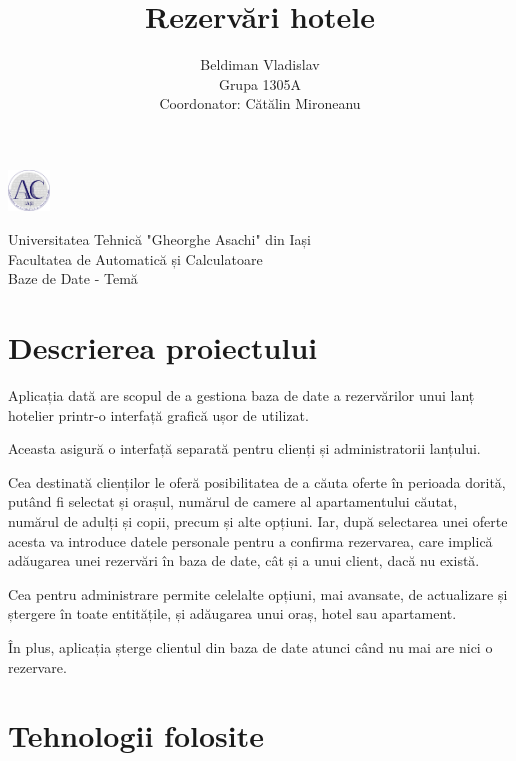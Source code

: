 \documentclass[12pt]{article}
\title{\textbf{Rezervări hotele}}
\author{
	Beldiman Vladislav \\ Grupa 1305A
	\\
	Coordonator: Cătălin Mironeanu
}
\begin{document}
\noindent\begin{minipage}{0.1\textwidth}
	\includegraphics[width=1.1cm]{logo_AC.png}
\end{minipage}
\hfill
\begin{minipage}{1\textwidth}\raggedright
	Universitatea Tehnică "Gheorghe Asachi" din Iași\\
	Facultatea de Automatică și Calculatoare\\
	Baze de Date - Temă
\end{minipage}

\vspace{5cm}
{\let\newpage\relax\maketitle}
\newpage

\tableofcontents

\vspace{4cm}

\section{Descrierea proiectului}

Aplicația dată are scopul de a gestiona baza de date a rezervărilor unui lanț hotelier printr-o interfață grafică ușor de utilizat.

Aceasta asigură o interfață separată pentru clienți și administratorii lanțului.

Cea destinată clienților le oferă posibilitatea de a căuta oferte în perioada dorită, putând fi selectat și orașul, numărul de camere al apartamentului căutat, numărul de adulți și copii, precum și alte opțiuni. Iar, după selectarea unei oferte acesta va introduce datele personale pentru a confirma rezervarea, care implică adăugarea unei rezervări în baza de date, cât și a unui client, dacă nu există.

Cea pentru administrare permite celelalte opțiuni, mai avansate, de actualizare și ștergere în toate entitățile, și adăugarea unui oraș, hotel sau apartament.

În plus, aplicația șterge clientul din baza de date atunci când nu mai are nici o rezervare.

\newpage

\section{Tehnologii folosite}
\end{document}
